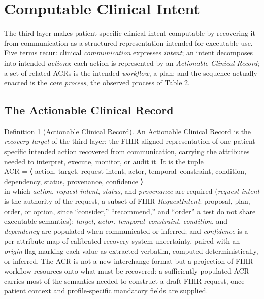 \section{Computable Clinical Intent}\label{computable-clinical-intent}

The third layer makes patient-specific clinical intent computable by recovering it from communication as a structured representation intended for executable use. Five terms recur: clinical \emph{communication} expresses \emph{intent}; an intent decomposes into intended \emph{actions}; each action is represented by an \emph{Actionable Clinical Record}; a set of related ACRs is the intended \emph{workflow}, a plan; and the sequence actually enacted is the \emph{care process}, the observed process of Table 2.

\subsection{The Actionable Clinical Record}\label{the-actionable-clinical-record}

{Definition 1 (Actionable Clinical Record).} An Actionable Clinical Record is the \emph{recovery target} of the third layer: the FHIR-aligned representation of one patient-specific intended action recovered from communication, carrying the attributes needed to interpret, execute, monitor, or audit it. It is the tuple\\
{ACR = ⟨ action, target, request-intent, actor, temporal~constraint, condition, dependency, status, provenance, confidence ⟩}\\
in which \emph{action}, \emph{request-intent}, \emph{status}, and \emph{provenance} are required (\emph{request-intent} is the authority of the request, a subset of FHIR \emph{RequestIntent}: proposal, plan, order, or option, since ``consider,'' ``recommend,'' and ``order'' a test do not share executable semantics); \emph{target}, \emph{actor}, \emph{temporal~constraint}, \emph{condition}, and \emph{dependency} are populated when communicated or inferred; and \emph{confidence} is a per-attribute map of calibrated recovery-system uncertainty, paired with an \emph{origin} flag marking each value as extracted verbatim, computed deterministically, or inferred. The ACR is not a new interchange format but a projection of FHIR workflow resources onto what must be recovered: a sufficiently populated ACR carries most of the semantics needed to construct a draft FHIR request, once patient context and profile-specific mandatory fields are supplied.

